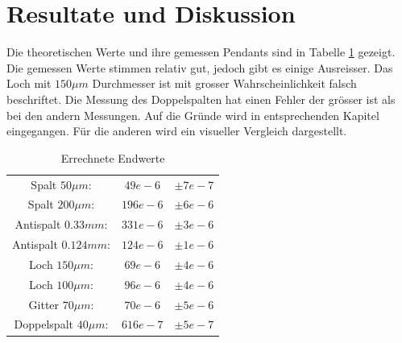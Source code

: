 \section{Resultate und Diskussion}\label{sec:diskussion}
Die theoretischen Werte und ihre gemessen Pendants sind in Tabelle \ref{tab:final} gezeigt. Die gemessen Werte stimmen relativ gut, jedoch gibt es einige Ausreisser. Das Loch mit $150\mu m$ Durchmesser ist mit grosser Wahrscheinlichkeit falsch beschriftet. Die Messung des Doppelspalten hat einen Fehler der grösser ist als bei den andern Messungen. Auf die Gründe wird in entsprechenden Kapitel eingegangen. Für die anderen wird ein visueller Vergleich dargestellt.

\begin{table}[H]
	\centering
	\begin{tabular}{ccc}
		Spalt $50\mu m$:		&  $49e-6$  	&  $\pm7e-7$\\
		Spalt $200\mu m$:		&  $196e-6$		&  $\pm6e-6$\\
		Antispalt $0.33mm$: 	&  $331e-6$		&  $\pm3e-6$\\
		Antispalt $0.124mm$:	&  $124e-6$		&  $\pm1e-6$\\
		Loch $150\mu m$: 		&  $69e-6$		&  $\pm4e-6$\\
		Loch $100\mu m$: 		&  $96e-6$		&  $\pm4e-6$\\
		Gitter $70\mu m$:  		&  $70e-6$		&  $\pm5e-6$\\
		Doppelspalt $40\mu m$: 	&  $616e-7$		&  $\pm5e-7$\\
	\end{tabular}
	\caption{Errechnete Endwerte}
	\label{tab:final}
\end{table}

